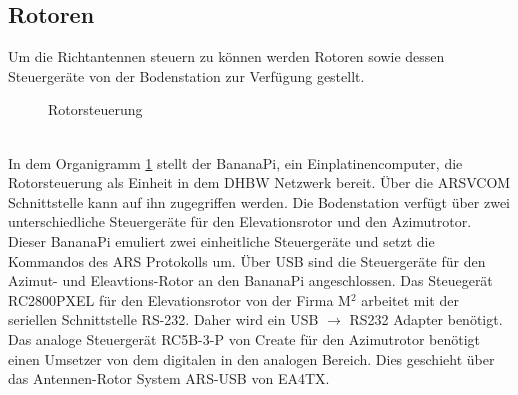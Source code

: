 \subsection{Rotoren}
\label{chap:rotoren}
Um die Richtantennen steuern zu können werden Rotoren sowie dessen Steuergeräte von der Bodenstation zur Verfügung gestellt.
\begin{figure}[h]
	\centering
	
	\caption{Rotorsteuerung}
	\label{fig:azel}
\end{figure}\\
In dem Organigramm \ref{fig:azel} stellt der BananaPi, ein Einplatinencomputer, die Rotorsteuerung als Einheit in dem DHBW Netzwerk bereit. Über die 
ARSVCOM Schnittstelle kann auf ihn zugegriffen werden. Die Bodenstation verfügt über zwei unterschiedliche Steuergeräte für den Elevationsrotor und 
den Azimutrotor. Dieser BananaPi emuliert zwei einheitliche Steuergeräte und setzt die Kommandos des ARS Protokolls um. Über USB sind die 
Steuergeräte für den Azimut- und Eleavtions-Rotor an den BananaPi angeschlossen. Das Steuegerät RC2800PXEL für den 
Elevationsrotor von der Firma M$^2$ arbeitet mit der seriellen Schnittstelle RS-232. Daher wird ein USB $\rightarrow$ RS232 Adapter benötigt. Das 
analoge Steuergerät RC5B-3-P von Create für den Azimutrotor benötigt einen Umsetzer von dem digitalen in den analogen Bereich. Dies geschieht über 
das Antennen-Rotor System ARS-USB von EA4TX. 
\clearpage
